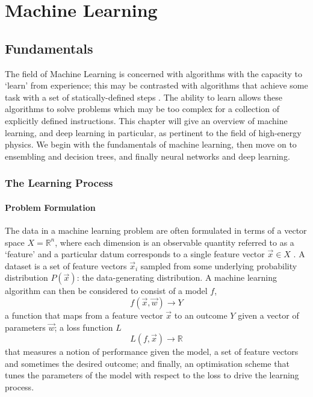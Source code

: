 \chapter{Machine Learning}
\label{chap:machine_learning}



\section{Fundamentals}
The field of Machine Learning is concerned with algorithms with the capacity to `learn' from experience; this may be contrasted with algorithms that achieve some task with a set of statically-defined steps \cite{DeepLearningBook}. The ability to learn allows these algorithms to solve problems which may be too complex for a collection of explicitly defined instructions. 
This chapter will give an overview of machine learning, and deep learning in particular, as pertinent to the field of high-energy physics. We begin with the fundamentals of machine learning, then move on to ensembling and decision trees, and finally neural networks and deep learning.  


\subsection{The Learning Process}

\subsubsection{Problem Formulation}
The data in a machine learning problem are often formulated in terms of a vector space $X = \mathds{R}^{n}$, where each dimension is an observable quantity referred to as a `feature' and a particular datum corresponds to a single feature vector $\vec{x} \in X$ \cite{elementsOfStatsLearning}. A dataset is a set of feature vectors $\vec{x}_{i}$ sampled from some underlying probability distribution $P(\vec{x})$: the data-generating distribution.
A machine learning algorithm can then be considered \cite{elementsOfStatsLearning} to consist of a model $f$, 
\begin{equation}
    f(\vec{x},\vec{w})\rightarrow{Y}
\end{equation}
a function that maps from a feature vector $\vec{x}$ to an outcome $Y$ given a vector of parameters $\vec{w}$; a loss function $L$
\begin{equation}
    L(f,\vec{x})\rightarrow{\mathds{R}}
\end{equation}
that measures a notion of performance given the model, a set of feature vectors and sometimes the desired outcome; 
and finally, an optimisation scheme that tunes the parameters of the model with respect to the loss to drive the learning process.


